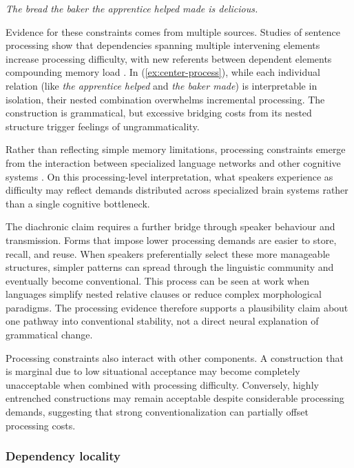 \documentclass[12pt,letterpaper]{article}
\begin{document}
\ea
\textit{The bread the baker the apprentice helped made is delicious.}\label{ex:center-process}
\z

Evidence for these constraints comes from multiple sources. Studies of sentence processing show that dependencies spanning multiple intervening elements increase processing difficulty, with new referents between dependent elements compounding memory load \autocite{gibson2000,Gibson2026}. In (\ref{ex:center-process}), while each individual relation (like \textit{the apprentice helped} and \textit{the baker made}) is interpretable in isolation, their nested combination overwhelms incremental processing. The construction is grammatical, but excessive bridging costs from its nested structure trigger feelings of ungrammaticality.

Rather than reflecting simple memory limitations, processing constraints emerge from the interaction between specialized language networks and other cognitive systems \autocite{Fedorenko2024}. On this processing-level interpretation, what speakers experience as difficulty may reflect demands distributed across specialized brain systems rather than a single cognitive bottleneck.

The diachronic claim requires a further bridge through speaker behaviour and transmission. Forms that impose lower processing demands are easier to store, recall, and reuse. When speakers preferentially select these more manageable structures, simpler patterns can spread through the linguistic community and eventually become conventional. This process can be seen at work when languages simplify nested relative clauses or reduce complex morphological paradigms. The processing evidence therefore supports a plausibility claim about one pathway into conventional stability, not a direct neural explanation of grammatical change.

Processing constraints also interact with other components. A construction that is marginal due to low situational acceptance may become completely unacceptable when combined with processing difficulty. Conversely, highly entrenched constructions may remain acceptable despite considerable processing demands, suggesting that strong conventionalization can partially offset processing costs.

\subsubsection{Dependency locality}\label{sec:dependency-locality}
\end{document}

